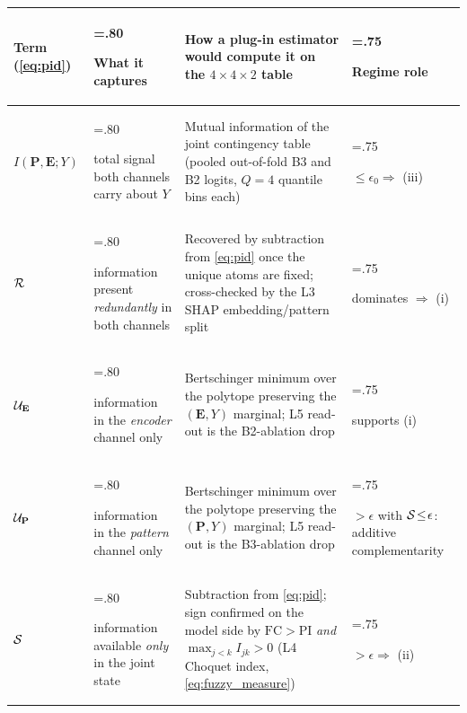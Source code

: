 \footnotesize
\setlength{\tabcolsep}{4pt}
\renewcommand{\arraystretch}{1.2}
\begin{tabularx}{\linewidth}{@{}l
  >{\hsize=.80\hsize\raggedright\arraybackslash}X
  >{\hsize=1.45\hsize\raggedright\arraybackslash}X
  >{\hsize=.75\hsize\raggedright\arraybackslash}X@{}}
\toprule
\textbf{Term (\cref{eq:pid})} & \textbf{What it captures} &
  \textbf{How a plug-in estimator would compute it on the
    $4\!\times\!4\!\times\!2$ table} &
  \textbf{Regime role} \\
\midrule
$I(\mathbf{P},\mathbf{E};Y)$ & total signal both channels carry about $Y$
  & Mutual information of the joint contingency table (pooled out-of-fold
    B3 and B2 logits, $Q\!=\!4$ quantile bins each)
  & $\le\epsilon_0\Rightarrow$ (iii) \\
\addlinespace[2pt]
$\mathcal{R}$ & information present \emph{redundantly} in both channels
  & Recovered by subtraction from \cref{eq:pid} once the unique atoms are
    fixed; cross-checked by the L3 SHAP embedding/pattern split
  & dominates $\Rightarrow$ (i) \\
\addlinespace[2pt]
$\mathcal{U}_{\mathbf{E}}$ & information in the \emph{encoder} channel only
  & Bertschinger minimum over the polytope preserving the
    $(\mathbf{E},Y)$ marginal; L5 read-out is the B2-ablation drop
  & supports (i) \\
\addlinespace[2pt]
$\mathcal{U}_{\mathbf{P}}$ & information in the \emph{pattern} channel only
  & Bertschinger minimum over the polytope preserving the
    $(\mathbf{P},Y)$ marginal; L5 read-out is the B3-ablation drop
  & $>\epsilon$ with $\mathcal{S}\!\le\!\epsilon$: additive complementarity \\
\addlinespace[2pt]
$\mathcal{S}$ & information available \emph{only} in the joint state
  & Subtraction from \cref{eq:pid}; sign confirmed on the model side by
    $\mathrm{FC}\!>\!\mathrm{PI}$ \emph{and} $\max_{j<k}I_{jk}\!>\!0$
    (L4 Choquet index, \cref{eq:fuzzy_measure})
  & $>\epsilon\Rightarrow$ (ii) \\
\bottomrule
\end{tabularx}
